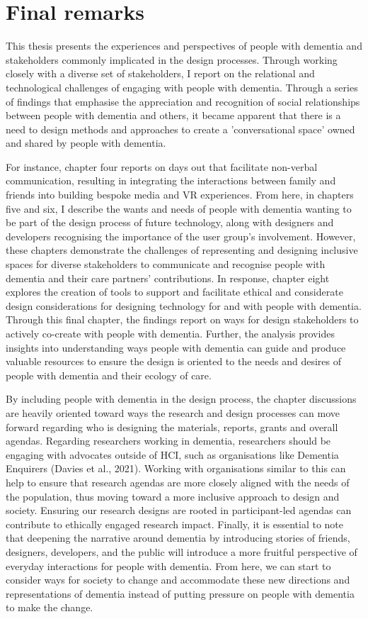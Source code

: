 \section{Final remarks}
\label{Discussion:FinalRemarks}
This thesis presents the experiences and perspectives of people with dementia and stakeholders commonly implicated in the design processes. Through working closely with a diverse set of stakeholders, I report on the relational and technological challenges of engaging with people with dementia. Through a series of findings that emphasise the appreciation and recognition of social relationships between people with dementia and others, it became apparent that there is a need to design methods and approaches to create a 'conversational space' owned and shared by people with dementia.

For instance, chapter four reports on days out that facilitate non-verbal communication, resulting in integrating the interactions between family and friends into building bespoke media and VR experiences. From here, in chapters five and six, I describe the wants and needs of people with dementia wanting to be part of the design process of future technology, along with designers and developers recognising the importance of the user group's involvement. However, these chapters demonstrate the challenges of representing and designing inclusive spaces for diverse stakeholders to communicate and recognise people with dementia and their care partners' contributions. In response, chapter eight explores the creation of tools to support and facilitate ethical and considerate design considerations for designing technology for and with people with dementia. Through this final chapter, the findings report on ways for design stakeholders to actively co-create with people with dementia. Further, the analysis provides insights into understanding ways people with dementia can guide and produce valuable resources to ensure the design is oriented to the needs and desires of people with dementia and their ecology of care.

By including people with dementia in the design process, the chapter discussions are heavily oriented toward ways the research and design processes can move forward regarding who is designing the materials, reports, grants and overall agendas. Regarding researchers working in dementia, researchers should be engaging with advocates outside of HCI, such as organisations like Dementia Enquirers (Davies et al., 2021). Working with organisations similar to this can help to ensure that research agendas are more closely aligned with the needs of the population, thus moving toward a more inclusive approach to design and society. Ensuring our research designs are rooted in participant-led agendas can contribute to ethically engaged research impact. Finally, it is essential to note that deepening the narrative around dementia by introducing stories of friends, designers, developers, and the public will introduce a more fruitful perspective of everyday interactions for people with dementia. From here, we can start to consider ways for society to change and accommodate these new directions and representations of dementia instead of putting pressure on people with dementia to make the change.



